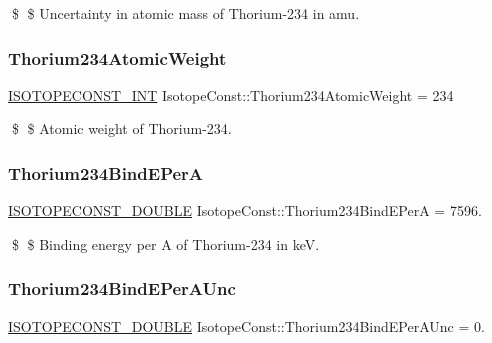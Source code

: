 \$ \$ Uncertainty in atomic mass of Thorium-\/234 in amu. \mbox{\label{group___isotope_const-_thorium-_th234_gac0b6a1cda185e0e00cb05f4aa4a6d486}} 
\subsubsection{\texorpdfstring{Thorium234\+Atomic\+Weight}{Thorium234AtomicWeight}}
{\footnotesize\ttfamily \mbox{\hyperlink{group___isotope_const-_macros_ga5f18360b3e99483a35c32d789e62621c}{I\+S\+O\+T\+O\+P\+E\+C\+O\+N\+S\+T\+\_\+\+I\+NT}} Isotope\+Const\+::\+Thorium234\+Atomic\+Weight = 234}

\$ \$ Atomic weight of Thorium-\/234. \mbox{\label{group___isotope_const-_thorium-_th234_ga0391833fe963d91f662d024c2c5f9a23}} 
\subsubsection{\texorpdfstring{Thorium234\+Bind\+E\+PerA}{Thorium234BindEPerA}}
{\footnotesize\ttfamily \mbox{\hyperlink{group___isotope_const-_macros_ga8f45a7272ce02c0b4c65c44636ed719a}{I\+S\+O\+T\+O\+P\+E\+C\+O\+N\+S\+T\+\_\+\+D\+O\+U\+B\+LE}} Isotope\+Const\+::\+Thorium234\+Bind\+E\+PerA = 7596.}

\$ \$ Binding energy per A of Thorium-\/234 in keV. \mbox{\label{group___isotope_const-_thorium-_th234_ga12ca0c601292967cea4c6b36301baf73}} 
\subsubsection{\texorpdfstring{Thorium234\+Bind\+E\+Per\+A\+Unc}{Thorium234BindEPerAUnc}}
{\footnotesize\ttfamily \mbox{\hyperlink{group___isotope_const-_macros_ga8f45a7272ce02c0b4c65c44636ed719a}{I\+S\+O\+T\+O\+P\+E\+C\+O\+N\+S\+T\+\_\+\+D\+O\+U\+B\+LE}} Isotope\+Const\+::\+Thorium234\+Bind\+E\+Per\+A\+Unc = 0.}

